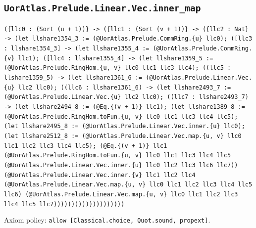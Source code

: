 \documentclass[11pt]{article}
\begin{document}
\subsection*{\texttt{UorAtlas.Prelude.Linear.Vec.inner\_map}}
\noindent\texttt{(\{llc0 : (Sort (u + 1))\} -> (\{llc1 : (Sort (v + 1))\} -> (\{llc2 : Nat\} -> (let llshare1354\_3 := (@UorAtlas.Prelude.CommRing.\{u\} llc0); ([llc3 : llshare1354\_3] -> (let llshare1355\_4 := (@UorAtlas.Prelude.CommRing.\{v\} llc1); ([llc4 : llshare1355\_4] -> (let llshare1359\_5 := (@UorAtlas.Prelude.RingHom.\{u, v\} llc0 llc1 llc3 llc4); ((llc5 : llshare1359\_5) -> (let llshare1361\_6 := (@UorAtlas.Prelude.Linear.Vec.\{u\} llc2 llc0); ((llc6 : llshare1361\_6) -> (let llshare2493\_7 := (@UorAtlas.Prelude.Linear.Vec.\{u\} llc2 llc0); ((llc7 : llshare2493\_7) -> (let llshare2494\_8 := (@Eq.\{(v + 1)\} llc1); (let llshare1389\_8 := (@UorAtlas.Prelude.RingHom.toFun.\{u, v\} llc0 llc1 llc3 llc4 llc5); (let llshare2495\_8 := (@UorAtlas.Prelude.Linear.Vec.inner.\{u\} llc0); (let llshare2512\_8 := (@UorAtlas.Prelude.Linear.Vec.map.\{u, v\} llc0 llc1 llc2 llc3 llc4 llc5); (@Eq.\{(v + 1)\} llc1 (@UorAtlas.Prelude.RingHom.toFun.\{u, v\} llc0 llc1 llc3 llc4 llc5 (@UorAtlas.Prelude.Linear.Vec.inner.\{u\} llc0 llc2 llc3 llc6 llc7)) (@UorAtlas.Prelude.Linear.Vec.inner.\{v\} llc1 llc2 llc4 (@UorAtlas.Prelude.Linear.Vec.map.\{u, v\} llc0 llc1 llc2 llc3 llc4 llc5 llc6) (@UorAtlas.Prelude.Linear.Vec.map.\{u, v\} llc0 llc1 llc2 llc3 llc4 llc5 llc7))))))))))))))))))))}\par
\noindent Axiom policy: \texttt{allow [Classical.choice, Quot.sound, propext]}.\par
\end{document}
